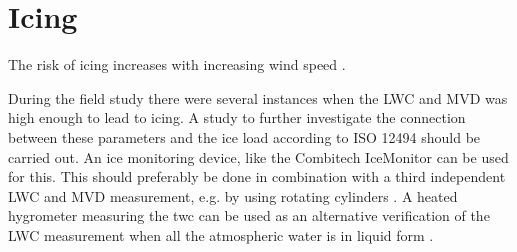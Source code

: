 \section{Icing}

The risk of icing increases with increasing wind speed \cite{makk2000}.

During the field study there were several instances when the LWC and MVD was high enough to lead to icing. A study to further investigate the connection between these parameters and the ice load according to ISO 12494 \cite{makk2014} should be carried out. An ice monitoring device, like the Combitech IceMonitor \cite{cost727,thors2015} can be used for this. This should preferably be done in combination with a third independent LWC and MVD measurement, e.g. by using rotating cylinders \cite{makk1992,knez2005}. A heated hygrometer measuring the \gls{twc} can be used as an alternative verification of the LWC measurement when all the atmospheric water is in liquid form \cite{spie2012}.






